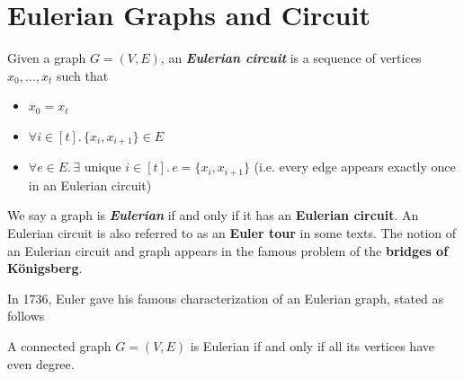 



\section{Eulerian Graphs and Circuit}

\begin{definition}
    Given a graph $G = (V,E)$, an \textit{\textbf{Eulerian circuit}} is a sequence of vertices $x_0,\ldots,x_t$ such that
    \begin{itemize}
        \item $x_0 = x_t$ 
        \item $\forall i \in [t].\, \{x_i, x_{i+1}\} \in E$ 
        \item $\forall e \in E.\, \exists \text{ unique $i \in [t]$.}\, e = \{x_i, x_{i+1}\}$ (i.e. every edge appears exactly once in an Eulerian circuit)
    \end{itemize}
\end{definition}

We say a graph is \textit{\textbf{Eulerian}} if and only if it has an \textbf{Eulerian circuit}. An Eulerian circuit is also referred to as an \textbf{Euler tour} in some texts. The notion of an Eulerian circuit and graph appears in the famous problem of the \textbf{bridges of K\"onigsberg}.

In 1736, Euler gave his famous characterization of an Eulerian graph, stated as follows

\begin{theorem}[Euler, 1736]
    A connected graph $G = (V,E)$ is Eulerian if and only if all its vertices have even degree.
\end{theorem}

